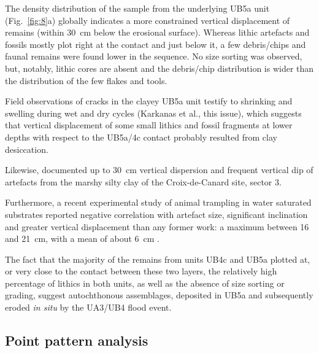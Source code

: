\documentclass[review,authoryear,times]{elsarticle} %
\begin{document}
The density distribution of the sample from the underlying UB5a unit (Fig.~\ref{fig:8}a) globally indicates a more constrained vertical displacement of remains (within 30~cm below the erosional surface). Whereas lithic artefacts and fossils mostly plot right at the contact and just below it, a few debris/chips and faunal remains were found lower in the sequence. No size sorting was observed, but, notably, lithic cores are absent and the debris/chip distribution is wider than the distribution of the few flakes and tools.

Field observations of cracks in the clayey UB5a unit testify to shrinking and swelling during wet and dry cycles (Karkanas et al., this issue), which suggests that vertical displacement of some small lithics and fossil fragments at lower depths with respect to the UB5a/4c contact probably resulted from clay desiccation.

Likewise, \cite{Lenoble2004} documented up to 30~cm vertical dispersion and frequent vertical dip of artefacts from the marshy silty clay of the Croix-de-Canard site, sector 3.

Furthermore, a recent experimental study of animal trampling in water saturated substrates reported negative correlation with artefact size, significant inclination and greater vertical displacement than any former work: a maximum between 16 and 21~cm, with a mean of about 6~cm \citep{Eren2010}.

The fact that the majority of the remains from units UB4c and UB5a plotted at, or very close to the contact between these two layers, the relatively high percentage of lithics in both units, as well as the absence of size sorting or grading, suggest autochthonous assemblages, deposited in UB5a and subsequently eroded \emph{in situ} by the UA3/UB4 flood event.

\subsection{Point pattern analysis}

\end{document}
